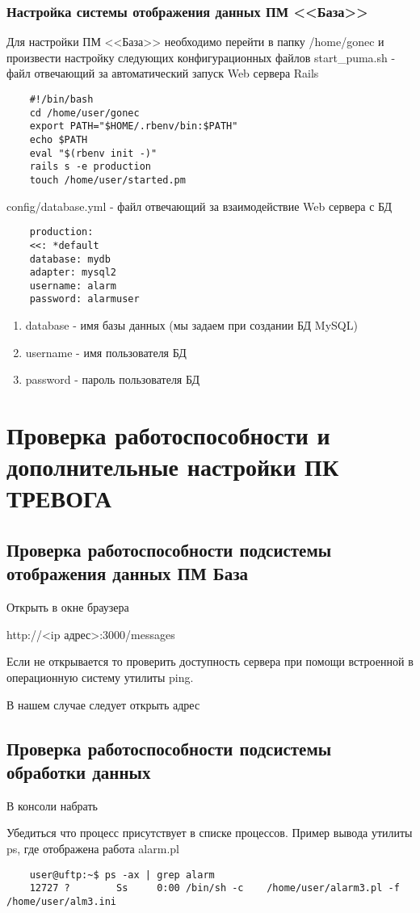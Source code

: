\documentclass[12pt]{article}[a4paper,14pt,russian]
\begin{document}
	\subsubsection{Настройка системы отображения данных ПМ <<База>>}
	Для настройки ПМ <<База>> необходимо перейти в папку /home/gonec и произвести 
	настройку следующих конфигурационных файлов
	start\_puma.sh - файл отвечающий за автоматический запуск Web сервера Rails
	\begin{verbatim}
	#!/bin/bash
	cd /home/user/gonec
	export PATH="$HOME/.rbenv/bin:$PATH"
	echo $PATH
	eval "$(rbenv init -)"
	rails s -e production
	touch /home/user/started.pm
	\end{verbatim}

    config/database.yml - файл отвечающий за взаимодействие Web сервера с БД
\begin{verbatim}
	production:
	<<: *default
	database: mydb
	adapter: mysql2
	username: alarm
	password: alarmuser
\end{verbatim}	
 \begin{enumerate}
\item database - имя базы данных (мы задаем при создании БД  MySQL)
\item username - имя пользователя БД
\item password - пароль пользователя БД
  \end{enumerate}
	\section {Проверка работоспособности и дополнительные настройки ПК ТРЕВОГА}	
	\subsection{Проверка работоспособности подсистемы отображения данных ПМ База}
	Открыть в окне браузера 
	
	http://<ip адрес>:3000/messages
	
	Если не открывается то проверить доступность сервера при
	помощи встроенной в операционную систему утилиты ping.
	
   
   
    В нашем случае следует открыть адрес
    
    
    \subsection{Проверка работоспособности подсистемы обработки данных}
    В консоли набрать
    
    
    
    
    Убедиться что процесс присутствует в списке процессов. Пример вывода утилиты ps, где отображена работа alarm.pl
    \begin{verbatim}
    user@uftp:~$ ps -ax | grep alarm
    12727 ?        Ss     0:00 /bin/sh -c    /home/user/alarm3.pl -f /home/user/alm3.ini
    \end{verbatim}
 
\end{document}
